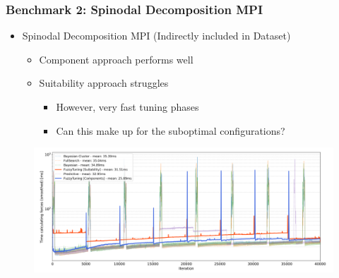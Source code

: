 \documentclass[
	10pt,
	t		%
]{beamer}
\begin{document}
\begin{frame}
	\frametitle{Benchmark 2: Spinodal Decomposition MPI}
	
	\begin{itemize}
		\item Spinodal Decomposition MPI (Indirectly included in Dataset)
		      \begin{itemize}
			      \item Component approach performs well
			      \item Suitability approach struggles
			            \begin{itemize}
				            \item However, very fast tuning phases
				            \item Can this make up for the suboptimal configurations?
			            \end{itemize}
		      \end{itemize}
	\end{itemize}
	
	\vspace{-0.1cm}
	
	\begin{figure}
		\centering
		\includegraphics[width=1\textwidth]{figures/spinodal-timings.png}
	\end{figure}
\end{frame}
\end{document}
